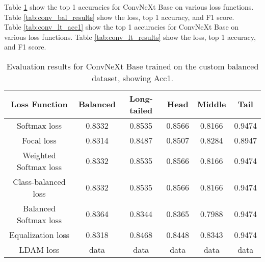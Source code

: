 Table \ref{tab:conv_bal_acc1} show the top 1 accuracies for ConvNeXt Base on various loss functions. Table \ref{tab:conv_bal_results} show the loss, top 1 accuracy, and F1 score.\\

Table \ref{tab:conv_lt_acc1} show the top 1 accuracies for ConvNeXt Base on various loss functions. Table \ref{tab:conv_lt_results} show the loss, top 1 accuracy, and F1 score.

\begin{table}[h!]
    \centering
    \begin{tabular}{cccccc}
        \toprule
        Loss Function & Balanced & Long-tailed & Head & Middle & Tail \\ 
        \midrule
        Softmax loss   & 0.8332 & 0.8535 & 0.8566 & 0.8166 & 0.9474 \\
        Focal loss   & 0.8314 & 0.8487 & 0.8507 & 0.8284 & 0.8947 \\
        Weighted Softmax loss   & 0.8332 & 0.8535 & 0.8566 &  0.8166 & 0.9474 \\
        Class-balanced loss   & 0.8332 & 0.8535 & 0.8566 & 0.8166 & 0.9474 \\
        Balanced Softmax loss   & 0.8364 & 0.8344 & 0.8365 & 0.7988 & 0.9474 \\
        Equalization loss   & 0.8318 & 0.8468 & 0.8448 & 0.8343 & 0.9474 \\
        LDAM loss   & data & data & data & data & data \\
        \bottomrule
    \end{tabular}
    \caption{Evaluation results for ConvNeXt Base trained on the custom balanced dataset, showing Acc1.}
    \label{tab:conv_bal_acc1}
\end{table}

